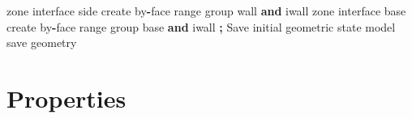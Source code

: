 \documentclass[a4paper, nobind]{templates/ociamthesis}
\newenvironment{Shaded}{\begin{snugshade}}{\end{snugshade}}
\newcommand{\BuiltInTok}[1]{#1}
\newcommand{\KeywordTok}[1]{\textcolor[rgb]{0.13,0.29,0.53}{\textbf{#1}}}
\newcommand{\NormalTok}[1]{#1}
\newcommand{\OperatorTok}[1]{\textcolor[rgb]{0.81,0.36,0.00}{\textbf{#1}}}
\newcommand{\StringTok}[1]{\textcolor[rgb]{0.31,0.60,0.02}{#1}}
\renewenvironment{Shaded}
{
  \vspace{10pt}%
  \begin{snugshade}%
}{%
  \end{snugshade}%
  \vspace{8pt}%
}
\begin{document}
\begin{Shaded}
\begin{Highlighting}[]
\NormalTok{zone interface }\StringTok{\textquotesingle{}side\textquotesingle{}}\NormalTok{ create by}\OperatorTok{{-}}\NormalTok{face }\BuiltInTok{range}\NormalTok{ group }\StringTok{\textquotesingle{}wall\textquotesingle{}} \KeywordTok{and} \StringTok{\textquotesingle{}iwall\textquotesingle{}}
\NormalTok{zone interface }\StringTok{\textquotesingle{}base\textquotesingle{}}\NormalTok{ create by}\OperatorTok{{-}}\NormalTok{face }\BuiltInTok{range}\NormalTok{ group }\StringTok{\textquotesingle{}base\textquotesingle{}} \KeywordTok{and} \StringTok{\textquotesingle{}iwall\textquotesingle{}}
\OperatorTok{;}\NormalTok{ Save initial geometric state}
\NormalTok{model save }\StringTok{\textquotesingle{}geometry\textquotesingle{}}
\end{Highlighting}
\end{Shaded}

\hypertarget{properties}{%
\section{Properties}\label{properties}}
\end{document}
